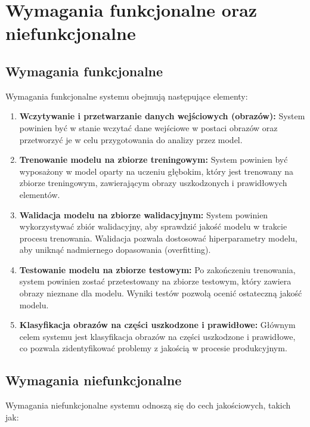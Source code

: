 \chapter{Wymagania funkcjonalne oraz niefunkcjonalne}

\section{Wymagania funkcjonalne}
Wymagania funkcjonalne systemu obejmują następujące elementy:

\begin{enumerate}
\item \textbf{Wczytywanie i przetwarzanie danych wejściowych (obrazów):} System powinien być w stanie wczytać dane wejściowe w postaci obrazów oraz przetworzyć je w celu przygotowania do analizy przez model.

\item \textbf{Trenowanie modelu na zbiorze treningowym:} System powinien być wyposażony w model oparty na uczeniu głębokim, który jest trenowany na zbiorze treningowym, zawierającym obrazy uszkodzonych i prawidłowych elementów.

\item \textbf{Walidacja modelu na zbiorze walidacyjnym:} System powinien wykorzystywać zbiór walidacyjny, aby sprawdzić jakość modelu w trakcie procesu trenowania. Walidacja pozwala dostosować hiperparametry modelu, aby uniknąć nadmiernego dopasowania (overfitting).

\item \textbf{Testowanie modelu na zbiorze testowym:} Po zakończeniu trenowania, system powinien zostać przetestowany na zbiorze testowym, który zawiera obrazy nieznane dla modelu. Wyniki testów pozwolą ocenić ostateczną jakość modelu.

\item \textbf{Klasyfikacja obrazów na części uszkodzone i prawidłowe:} Głównym celem systemu jest klasyfikacja obrazów na części uszkodzone i prawidłowe, co pozwala zidentyfikować problemy z jakością w procesie produkcyjnym.

\end{enumerate}

\section{Wymagania niefunkcjonalne}
Wymagania niefunkcjonalne systemu odnoszą się do cech jakościowych, takich jak:

